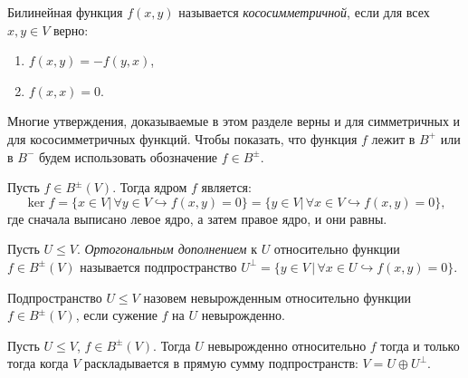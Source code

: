 \begin{definition}
    Билинейная функция $f(x, y)$ называется \textit{кососимметричной}, если для всех $x, y \in V$ верно:
    \begin{enumerate}
        \item $f(x, y) = -f(y, x)$,
        \item $f(x, x) = 0$.
    \end{enumerate}
\end{definition}

\begin{agreement}
    Многие утверждения, доказываемые в этом разделе верны и для симметричных и для кососимметричных 
    функций. Чтобы показать, что функция $f$ лежит в $B^+$ или в $B^-$ будем использовать 
    обозначение $f \in B^{\pm}$.
\end{agreement}

\begin{definition}
    \label{def8.5}
    Пусть $f \in B^{\pm}(V)$. Тогда ядром $f$ является: 
    $$\ker f = \{x \in V \vert \, \forall y \in V \hookrightarrow f(x, y) = 0\} = 
    \{y \in V \vert \, \forall x \in V \hookrightarrow f(x, y) = 0\},$$ 
    где сначала выписано левое ядро, а затем правое ядро, и они равны.
\end{definition}

\begin{definition}
    Пусть $U \leq V$. \textit{Ортогональным дополнением} к $U$ относительно функции $f \in B^{\pm}(V)$ 
    называется подпространство $U^{\perp} = \{y \in V \,\vert \, \forall x \in U \hookrightarrow 
    f(x, y) = 0\}$.
\end{definition}

\begin{definition}
    Подпространство $U \leq V$ назовем невырожденным относительно функции $f \in B^{\pm}(V)$, если 
    сужение $f$ на $U$ невырожденно.
\end{definition}

\begin{theorem}
    \label{th8.1}
    Пусть $U \leq V$, $f \in B^{\pm}(V)$. Тогда $U$ невырожденно относительно $f$ тогда и только 
    тогда когда $V$ раскладывается в прямую сумму подпространств: $V = U \oplus U^{\perp}$.
\end{theorem}

